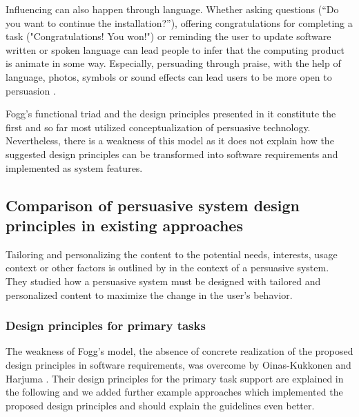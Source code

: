 Influencing can also happen through language. Whether asking questions
(“Do you want to continue the installation?”), offering congratulations for
completing a task ("Congratulations! You won!") or reminding the user to update software written or spoken language can lead people to infer that the computing product is animate in some way. Especially, persuading through praise, with the help of language, photos, symbols or sound effects can lead users to be more open to persuasion \cite{fogg2002persuasive}.

Fogg’s \cite{fogg2002persuasive} functional triad and the design principles presented in it constitute the first and so far most utilized conceptualization of persuasive technology. Nevertheless, there is a weakness of this model as it does not explain how the suggested design principles can be transformed into software requirements and implemented as system features.

\subsection{Comparison of persuasive system design principles in existing approaches}

Tailoring and personalizing the content to the potential needs, interests, usage context or other factors is outlined by \cite{oinas2009persuasive} in the context of a persuasive system. They studied how a persuasive system must be designed with tailored and personalized content to maximize the change in the user's behavior. 

\subsubsection{Design principles for primary tasks}

The weakness of Fogg's model, the absence of concrete realization of the proposed design principles in software requirements, was overcome by Oinas-Kukkonen and Harjuma \cite{oinas2009persuasive}. Their design principles for the primary task support are explained in the following and we added further example approaches which implemented the proposed design principles and should explain the guidelines even better.

